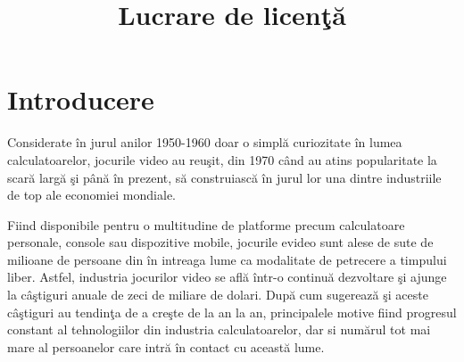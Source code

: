 \documentclass{article}
\title{\bf Lucrare de licen\c{t}\u{a}}
\begin{document}
  \maketitle
  \newpage

  \section {Introducere}

	Considerate \^{i}n jurul anilor 1950-1960 doar o simpl\u{a} curiozitate \^{i}n lumea calculatoarelor, jocurile video au reu\c{s}it, din 1970 c\^{a}nd au atins popularitate la scar\u{a} larg\u{a} \c{s}i p\^{a}n\u{a} \^{i}n prezent, s\u{a} construiasc\u{a} \^{i}n jurul lor una dintre industriile de top ale economiei mondiale.

	Fiind disponibile pentru o multitudine de platforme precum calculatoare personale, console sau dispozitive mobile, jocurile evideo sunt alese de sute de milioane de persoane din \^{i}n intreaga lume ca modalitate de petrecere a timpului liber. Astfel, industria jocurilor video se afl\u{a} \^{i}ntr-o continu\u{a} dezvoltare \c{s}i ajunge la c\^{a}\c{s}tiguri anuale de zeci de miliare de dolari. Dup\u{a} cum sugereaz\u{a} \c{s}i aceste c\^{a}\c{s}tiguri au tendin\c{t}a de a cre\c{s}te de la an la an, principalele motive fiind progresul constant al tehnologiilor din industria calculatoarelor, dar si num\u{a}rul tot mai mare al persoanelor care intr\u{a} \^{i}n contact cu aceast\u{a} lume.
\end{document}

